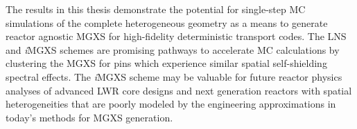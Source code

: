 \begin{abstractpage}
The results in this thesis demonstrate the potential for single-step MC simulations of the complete heterogeneous geometry as a means to generate reactor agnostic MGXS for high-fidelity deterministic transport codes. The LNS and \textit{i}MGXS schemes are promising pathways to accelerate MC calculations by clustering the MGXS for pins which experience similar spatial self-shielding spectral effects. The \textit{i}MGXS scheme may be valuable for future reactor physics analyses of advanced LWR core designs and next generation reactors with spatial heterogeneities that are poorly modeled by the engineering approximations in today's methods for MGXS generation.




\end{abstractpage}
